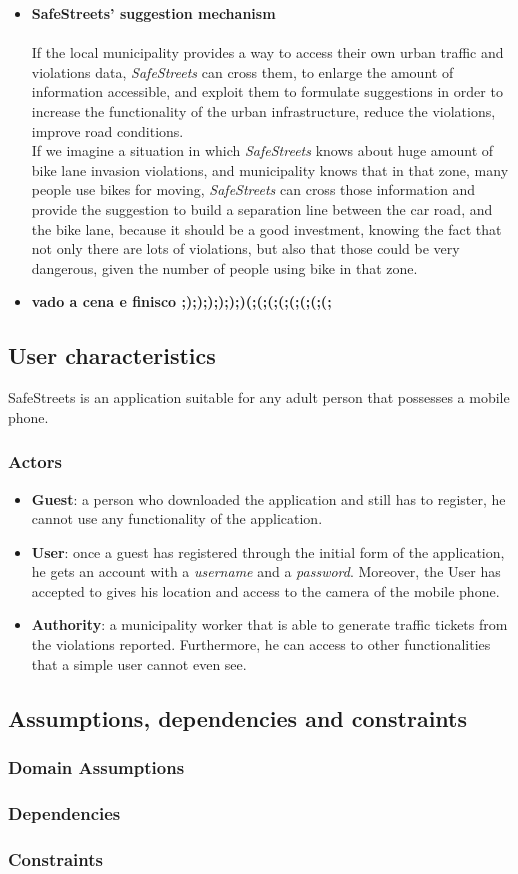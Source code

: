 \begin{itemize}
    \item\textbf{SafeStreets' suggestion mechanism}\\\\
    If the local municipality provides a way to access their own urban traffic and violations data, \textit{SafeStreets} can cross them, to enlarge the amount of information accessible, and exploit them to formulate suggestions in order to increase the functionality of the urban infrastructure, reduce the violations, improve road conditions.\\
    If we imagine a situation in which \textit{SafeStreets} knows about huge amount of bike lane invasion violations, and municipality knows that in that zone, many people use bikes for moving, \textit{SafeStreets} can cross those information and provide the suggestion to build a separation line between the car road, and the bike lane, because it should be a good investment, knowing the fact that not only there are lots of violations, but also that those could be very dangerous, given the number of people using bike in that zone.
    
    \item\textbf{vado a cena e finisco ;);););););)(;(;(;(;(;(;(;(;}
\end{itemize}

\subsection{User
characteristics}
SafeStreets is an application suitable for any adult person that possesses a mobile phone.
\subsubsection{Actors}
\begin{itemize}
    \item \textbf{Guest}: a person who downloaded the application and still has to register, he cannot use any functionality of the application.
    \item \textbf{User}: once a guest has registered through the initial form of the application, he gets an account with a \textit{username} and a \textit{password}. Moreover, the User has accepted to gives his location and access to the camera of the mobile phone.
    \item \textbf{Authority}: a municipality worker that is able to generate traffic tickets from the violations reported. Furthermore, he can access to other functionalities that a simple user cannot even see.
\end{itemize}
\subsection{Assumptions,
dependencies
and
constraints}
\subsubsection{Domain Assumptions}
\subsubsection{Dependencies}
\subsubsection{Constraints}
